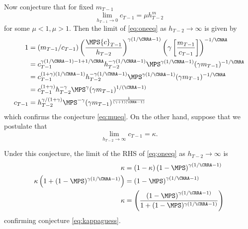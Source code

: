 \documentclass[titlepage, headings=optiontotocandhead]{\econtex}
\begin{document}
{  Now conjecture that for fixed ${m}_{T-1}$
  \begin{equation}
    \lim_{h_{T-1} \rightarrow 0} {c}_{T-1} = \mu h_{T-2}^{m}
    \label{eq:mueq}
  \end{equation}
  for some $\mu<1, \mu>1$.  Then the limit of \eqref{eq:oneeq} as $h_{T-2}
  \rightarrow \infty$ is given by
  \begin{equation*}\begin{gathered}\begin{aligned}
        1  & = ({m}_{T-1}/{c}_{T-1})\left(\frac{\MPS
            {c}_{T-1}}{h_{T-2}}\right)^{\gamma(1/\CRRA-1)}\left(\gamma
          \left[\frac{{m}_{T-1}}{{c}_{T-1}}\right]\right)^{-1/\CRRA}
        \\    
        & =                 {c}_{T-1}^{\gamma(1/\CRRA-1)-1+1/\CRRA}h_{T-2}^{-\gamma(1/\CRRA-1)}\MPS^{\gamma(1/\CRRA-1)}(\gamma {m}_{T-1})^{-1/\CRRA}
        \\    
        & =                 {c}_{T-1}^{(1+\gamma)(1/\CRRA-1)}h_{T-2}^{-\gamma(1/\CRRA-1)}\MPS^{\gamma(1/\CRRA-1)}(\gamma {m}_{T-1})^{-1/\CRRA}
        \\    
        & =                 {c}_{T-1}^{(1+\gamma)}h_{T-2}^{-\gamma}\MPS^{\gamma}(\gamma {m}_{T-1})^{1/(\CRRA-1)}
        \\ {c}_{T-1}    & = h_{T-2}^{\gamma/(1+\gamma)}\MPS^{-\gamma}(\gamma
        {m}_{T-1})^{\frac{1}{(\gamma+1)(\CRRA-1)}}
      \end{aligned}\end{gathered}\end{equation*}
  which confirms the conjecture \eqref{eq:mueq}.  On the other hand,
  suppose that we postulate that
  \begin{equation}
    \lim_{h_{T-2} \rightarrow \infty} {c}_{T-1} = \kappa.
    \label{eq:kappaguess}
  \end{equation}

  Under this conjecture, the limit of the RHS of \eqref{eq:oneeq} as
  $h_{T-2} \rightarrow \infty$ is
  \begin{equation*}\begin{gathered}\begin{aligned}
        \kappa 
        & =                  (1-\kappa)\left(1-\MPS\right)^{\gamma(1/\CRRA-1)}
        \\      \kappa\left(1+(1-\MPS)^{\gamma(1/\CRRA-1)}\right)  & = \left(1-\MPS\right)^{\gamma(1/\CRRA-1)}
        \\      \kappa 
        & =                          \left(\frac{\left(1-\MPS\right)^{\gamma(1/\CRRA-1)}}
          {1+(1-\MPS)^{\gamma(1/\CRRA-1)}}\right)
      \end{aligned}\end{gathered}\end{equation*}
  confirming conjecture \eqref{eq:kappaguess}.

}
\end{document}
